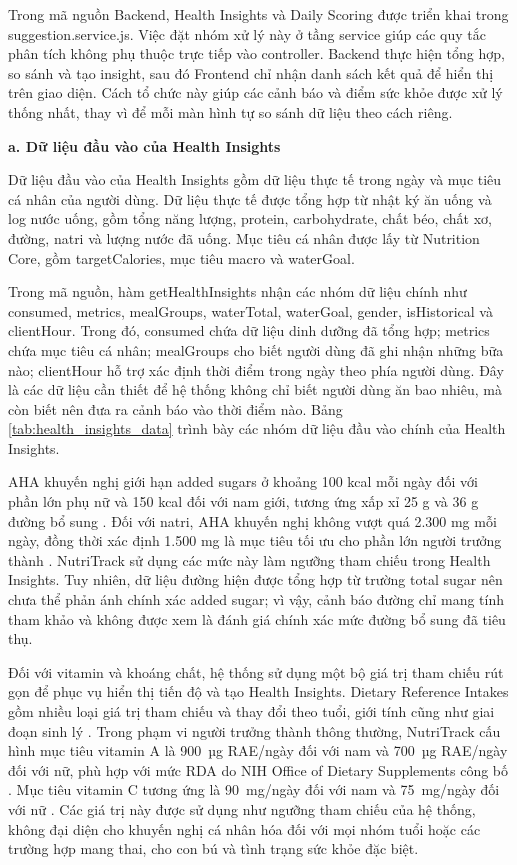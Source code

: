 \documentclass[12pt, a4paper]{report}
\begin{document}
Trong mã nguồn Backend, Health Insights và Daily Scoring được triển khai trong suggestion.service.js. Việc đặt nhóm xử lý này ở tầng service giúp các quy tắc phân tích không phụ thuộc trực tiếp vào controller. Backend thực hiện tổng hợp, so sánh và tạo insight, sau đó Frontend chỉ nhận danh sách kết quả để hiển thị trên giao diện. Cách tổ chức này giúp các cảnh báo và điểm sức khỏe được xử lý thống nhất, thay vì để mỗi màn hình tự so sánh dữ liệu theo cách riêng.

\textbf{a. Dữ liệu đầu vào của Health Insights}

Dữ liệu đầu vào của Health Insights gồm dữ liệu thực tế trong ngày và mục tiêu cá nhân của người dùng. Dữ liệu thực tế được tổng hợp từ nhật ký ăn uống và log nước uống, gồm tổng năng lượng, protein, carbohydrate, chất béo, chất xơ, đường, natri và lượng nước đã uống. Mục tiêu cá nhân được lấy từ Nutrition Core, gồm targetCalories, mục tiêu macro và waterGoal.

Trong mã nguồn, hàm getHealthInsights nhận các nhóm dữ liệu chính như consumed, metrics, mealGroups, waterTotal, waterGoal, gender, isHistorical và clientHour. Trong đó, consumed chứa dữ liệu dinh dưỡng đã tổng hợp; metrics chứa mục tiêu cá nhân; mealGroups cho biết người dùng đã ghi nhận những bữa nào; clientHour hỗ trợ xác định thời điểm trong ngày theo phía người dùng. Đây là các dữ liệu cần thiết để hệ thống không chỉ biết người dùng ăn bao nhiêu, mà còn biết nên đưa ra cảnh báo vào thời điểm nào. Bảng \ref{tab:health_insights_data} trình bày các nhóm dữ liệu đầu vào chính của Health Insights.

AHA khuyến nghị giới hạn added sugars ở khoảng 100 kcal mỗi ngày đối với phần lớn phụ nữ và 150 kcal đối với nam giới, tương ứng xấp xỉ 25 g và 36 g đường bổ sung \cite{aha_addedsugars}. Đối với natri, AHA khuyến nghị không vượt quá 2.300 mg mỗi ngày, đồng thời xác định 1.500 mg là mục tiêu tối ưu cho phần lớn người trưởng thành \cite{aha_sodium}. NutriTrack sử dụng các mức này làm ngưỡng tham chiếu trong Health Insights. Tuy nhiên, dữ liệu đường hiện được tổng hợp từ trường total sugar nên chưa thể phản ánh chính xác added sugar; vì vậy, cảnh báo đường chỉ mang tính tham khảo và không được xem là đánh giá chính xác mức đường bổ sung đã tiêu thụ.

Đối với vitamin và khoáng chất, hệ thống sử dụng một bộ giá trị tham chiếu rút gọn để phục vụ hiển thị tiến độ và tạo Health Insights. Dietary Reference Intakes gồm nhiều loại giá trị tham chiếu và thay đổi theo tuổi, giới tính cũng như giai đoạn sinh lý \cite{nihNutrientRecommendations}. Trong phạm vi người trưởng thành thông thường, NutriTrack cấu hình mục tiêu vitamin A là 900~µg RAE/ngày đối với nam và 700~µg RAE/ngày đối với nữ, phù hợp với mức RDA do NIH Office of Dietary Supplements công bố \cite{nihVitaminA}. Mục tiêu vitamin C tương ứng là 90~mg/ngày đối với nam và 75~mg/ngày đối với nữ \cite{nihVitaminC}. Các giá trị này được sử dụng như ngưỡng tham chiếu của hệ thống, không đại diện cho khuyến nghị cá nhân hóa đối với mọi nhóm tuổi hoặc các trường hợp mang thai, cho con bú và tình trạng sức khỏe đặc biệt.
\end{document}
